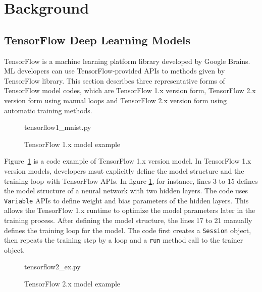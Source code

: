 \section{Background}\label{sec:background}
\subsection{TensorFlow Deep Learning Models}

TensorFlow\cite{tensorflow} is a machine learning platform library
developed by Google Brains.
ML developers can use TensorFlow-provided APIs to 
methods given by TensorFlow library.
This section describes three representative forms of TensorFlow
model codes, which are TensorFlow 1.x version form, 
TensorFlow 2.x version form using manual loops and
TensorFlow 2.x version form using automatic training methods.

\begin{figure}[ht!]

{tensorflow1_mnist.py}
  \caption{TensorFlow 1.x model example}
\label{fig:back:tf1}
\end{figure}

Figure~\ref{fig:back:tf1} is a code example of TensorFlow 1.x version model.
In TensorFlow 1.x version models, developers msut explicitly define
the model structure and the training loop with TensorFlow APIs.
In figure \ref{fig:back:tf1}, for instance, lines 3 to 15 defines the model
structure of a neural network with two hidden layers.
The code uses {\tt Variable} APIs to define weight and bias parameters of
the hidden layers. This allows the TensorFlow 1.x runtime to
optimize the model parameters later in the training process.
After defining the model structure, the lines 17 to 21
manually defines the training loop for the model.
The code first creates a {\tt Session} object,
then repeats the training step by a loop and a {\tt run} method call to the
trainer object. 

\begin{figure}[ht!]

{tensorflow2_ex.py}
  \caption{TensorFlow 2.x model example}
\label{fig:back:tf2}
\end{figure}

